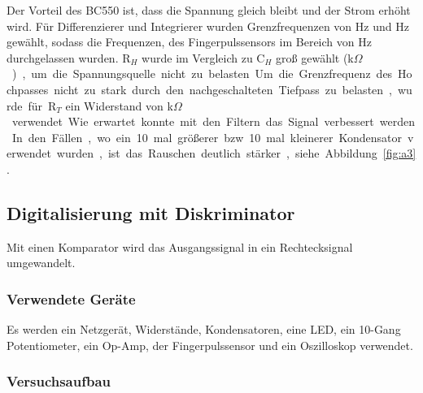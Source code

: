 \documentclass[12pt,a4paper]{article}
\begin{document}
Der Vorteil des BC550 ist, dass die Spannung gleich bleibt und der Strom erhöht wird. Für Differenzierer und Integrierer wurden Grenzfrequenzen von \unit[0,1]{Hz} und \unit[10]{Hz} gewählt, sodass die Frequenzen, des Fingerpulssensors im Bereich von \unit[1]{Hz} durchgelassen wurden. R$_H$ wurde im Vergleich zu C$_H$ groß gewählt (\unit[10]{k$\Omega$}), um die Spannungsquelle nicht zu belasten. Um die Grenzfrequenz des Hochpasses nicht zu stark durch den nachgeschalteten Tiefpass zu belasten, wurde für R$_T$ ein Widerstand von \unit[100]{k$\Omega$} verwendet. Wie erwartet konnte mit den Filtern das Signal verbessert werden. In den Fällen, wo ein 10 mal größerer bzw. 10 mal kleinerer Kondensator verwendet wurden, ist das Rauschen deutlich stärker, siehe Abbildung \ref{fig:a3}.


\subsection{Digitalisierung mit Diskriminator}

Mit einen Komparator wird das Ausgangssignal in ein Rechtecksignal umgewandelt.

\subsubsection*{Verwendete Geräte}

Es werden ein Netzgerät, Widerstände, Kondensatoren, eine LED, ein 10-Gang Potentiometer, ein Op-Amp, der Fingerpulssensor und ein Oszilloskop verwendet.

\subsubsection*{Versuchsaufbau}
\end{document}
